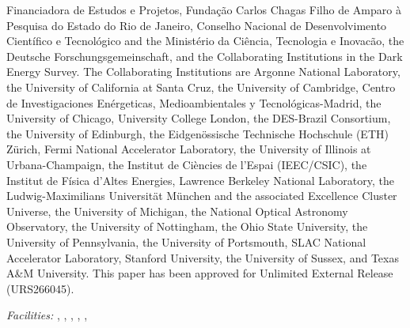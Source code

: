 \documentclass{emulateapj}
\begin{document}
Financiadora de Estudos e Projetos, Funda{\c c}{\~a}o Carlos Chagas Filho de Amparo {\`a} Pesquisa do Estado do Rio de Janeiro, 
Conselho Nacional de Desenvolvimento Cient{\'i}fico e Tecnol{\'o}gico and the Minist{\'e}rio da Ci{\^e}ncia, Tecnologia e Inovac{\~a}o, 
the Deutsche Forschungsgemeinschaft, 
and the Collaborating Institutions in the Dark Energy Survey. 
%
The Collaborating Institutions are 
Argonne National Laboratory, 
the University of California at Santa Cruz, 
the University of Cambridge, 
Centro de Investigaciones En{\'e}rgeticas, Medioambientales y Tecnol{\'o}gicas-Madrid, 
the University of Chicago, 
University College London, 
the DES-Brazil Consortium, 
the University of Edinburgh, 
the Eidgen{\"o}ssische Technische Hoch\-schule (ETH) Z{\"u}rich, 
Fermi National Accelerator Laboratory, 
the University of Illinois at Urbana-Champaign, 
the Institut de Ci{\`e}ncies de l'Espai (IEEC/CSIC), 
the Institut de F{\'i}sica d'Altes Energies, 
Lawrence Berkeley National Laboratory, 
the Ludwig-Maximilians Universit{\"a}t M{\"u}nchen and the associated Excellence Cluster Universe, 
the University of Michigan, 
{the} National Optical Astronomy Observatory, 
the University of Nottingham, 
the Ohio State University, 
the University of Pennsylvania, 
the University of Portsmouth, 
SLAC National Accelerator Laboratory, 
Stanford University, 
the University of Sussex, 
and Texas A\&M University.
This paper has been approved for Unlimited External Release (URS266045).
%

{\it Facilities: } , 
,
,
,
,
\end{document}
